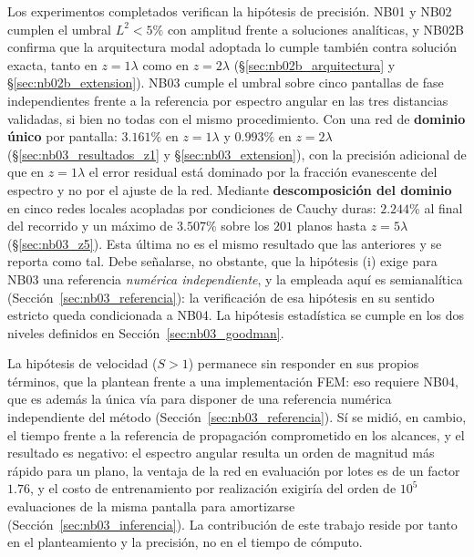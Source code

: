 Los experimentos completados verifican la hipótesis de precisión. NB01 y NB02
cumplen el umbral $L^2 < 5\%$ con amplitud frente a soluciones analíticas, y
NB02B confirma que la arquitectura modal adoptada lo cumple también contra
solución exacta, tanto en $z=1\lambda$ como en $z=2\lambda$
(§\ref{sec:nb02b_arquitectura} y §\ref{sec:nb02b_extension}). NB03 cumple el
umbral sobre cinco pantallas de fase independientes frente a la referencia por
espectro angular en las tres distancias validadas, si bien no todas con el
mismo procedimiento. Con una red de \textbf{dominio único} por pantalla:
$3.161\%$ en $z=1\lambda$ y $0.993\%$ en $z=2\lambda$
(§\ref{sec:nb03_resultados_z1} y §\ref{sec:nb03_extension}), con la precisión
adicional de que en $z=1\lambda$ el error residual está dominado por la
fracción evanescente del espectro y no por el ajuste de la red. Mediante
\textbf{descomposición del dominio} en cinco redes locales acopladas por
condiciones de Cauchy duras: $2.244\%$ al final del recorrido y un máximo de
$3.507\%$ sobre los $201$ planos hasta $z=5\lambda$ (§\ref{sec:nb03_z5}). Esta
última no es el mismo resultado que las anteriores y se reporta como tal. Debe señalarse, no
obstante, que la hipótesis (i) exige para NB03 una referencia \emph{numérica
independiente}, y la empleada aquí es semianalítica
(Sección~\ref{sec:nb03_referencia}): la verificación de esa hipótesis en su
sentido estricto queda condicionada a NB04. La hipótesis
estadística se cumple en los dos niveles definidos en
Sección~\ref{sec:nb03_goodman}.

La hipótesis de velocidad ($S > 1$) permanece sin responder en sus propios
términos, que la plantean frente a una implementación FEM: eso requiere NB04,
que es además la única vía para disponer de una referencia numérica
independiente del método (Sección~\ref{sec:nb03_referencia}). Sí se midió, en
cambio, el tiempo frente a la referencia de propagación comprometido en los
alcances, y el resultado es negativo: el espectro angular resulta un orden de
magnitud más rápido para un plano, la ventaja de la red en evaluación por lotes
es de un factor $1.76$, y el costo de entrenamiento por realización exigiría del
orden de $10^{5}$ evaluaciones de la misma pantalla para amortizarse
(Sección~\ref{sec:nb03_inferencia}). La contribución de este trabajo reside por
tanto en el planteamiento y la precisión, no en el tiempo de cómputo.
